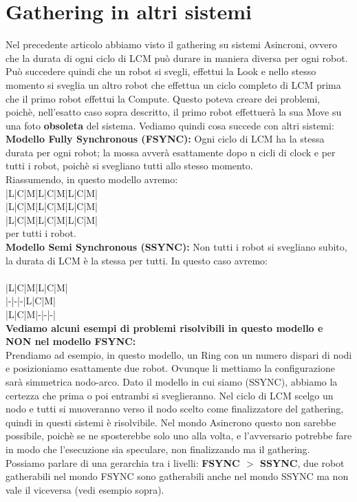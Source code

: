 \section{Gathering in altri sistemi}
Nel precedente articolo abbiamo visto il gathering su sistemi Asincroni, ovvero
che la durata di ogni ciclo di LCM può durare in maniera diversa per ogni robot.
Può succedere quindi che un robot si svegli, effettui la Look e nello stesso
momento si sveglia un altro robot che effettua un ciclo completo di LCM prima
che il primo robot effettui la Compute. Questo poteva creare dei problemi,
poichè, nell'esatto caso sopra descritto, il primo robot effettuerà la sua Move
su una foto \textbf{obsoleta} del sistema. Vediamo quindi cosa succede con altri
sistemi:\\

\textbf{Modello Fully Synchronous (FSYNC):} Ogni ciclo di LCM ha la stessa
durata per ogni robot; la mossa avverà esattamente dopo n cicli di clock e per
tutti i robot, poichè si svegliano tutti allo stesso momento.\\
Riassumendo, in questo modello avremo:\\
|L|C|M|L|C|M|L|C|M|\\
|L|C|M|L|C|M|L|C|M|\\
|L|C|M|L|C|M|L|C|M|\\
per tutti i robot.\\

\textbf{Modello Semi Synchronous (SSYNC):} Non tutti i robot si svegliano
subito, la durata di LCM è la stessa per tutti. In questo caso avremo:\\\\
|L|C|M|L|C|M|\\
|-|-|-|L|C|M|\\
|L|C|M|-|-|-|\\

\textbf{Vediamo alcuni esempi di problemi risolvibili in questo modello e NON
    nel modello FSYNC:}\\
Prendiamo ad esempio, in questo modello, un Ring con un numero dispari di nodi e
posizioniamo esattamente due robot. Ovunque li mettiamo la configurazione sarà
simmetrica nodo-arco. Dato il modello in cui siamo (SSYNC), abbiamo la certezza
che prima o poi entrambi si sveglieranno. Nel ciclo di LCM scelgo un nodo e
tutti si muoveranno verso il nodo scelto come finalizzatore del gathering,
quindi in questi sistemi è risolvibile. Nel mondo Asincrono questo non sarebbe
possibile, poichè se ne sposterebbe solo uno alla volta, e l'avversario potrebbe
fare in modo che l'esecuzione sia speculare, non finalizzando ma il gathering.\\
Possiamo parlare di una gerarchia tra i livelli: \textbf{FSYNC $>$ SSYNC}, due
robot gatherabili nel mondo FSYNC sono gatherabili anche nel mondo SSYNC ma non
vale il viceversa (vedi esempio sopra).

